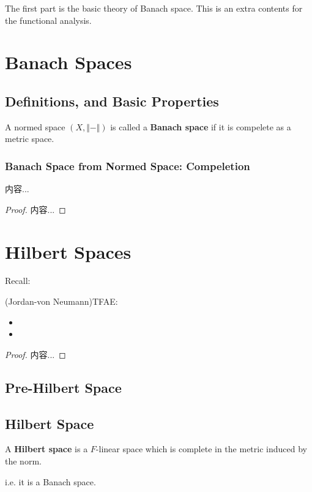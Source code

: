 \documentclass[Total.tex]{subfiles}
\begin{document}
	The first part is the basic theory of Banach space. This is an extra contents for the functional analysis. 
	
	\chapter{Banach Spaces}
		\section{Definitions, and Basic Properties}
			\begin{Def}
				A normed space $(X,\Vert-\Vert)$ is called a \textbf{Banach space} if it is compelete as a metric space. 
			\end{Def}
			\subsection{Banach Space from Normed Space: Compeletion}
				\begin{proposition}
					内容...
				\end{proposition}
				\begin{proof}
					内容...
				\end{proof}
				
	\chapter{Hilbert Spaces}
		Recall:
		
		\begin{lemma}
			(Jordan-von Neumann)TFAE:
			\begin{itemize}
				\item 
				\item 
			\end{itemize}
		\end{lemma}
		\begin{proof}
				内容...
			\end{proof}
		
		
		\section{Pre-Hilbert Space}
		\section{Hilbert Space}
			\begin{Def}
				A \textbf{Hilbert space} is a $F$-linear space which is complete in the metric induced by the norm.
				
				i.e. it is a Banach space. 
			\end{Def}
\end{document}
